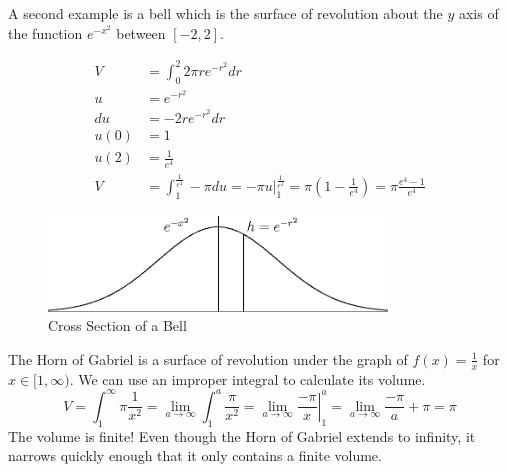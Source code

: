 \documentclass[fleqn]{report}
\begin{document}
\begin{example}
A second example is a bell which is the surface of revolution
about the $y$ axis of the function $e^{-x^2}$ between $[-2,2]$. 

\begin{align*}
V & = \int_0^2 2\pi re^{-r^2} dr \\
u & = e^{-r^2}\\
du & = -2r e^{-r^2} dr \\
u(0) & = 1 \\
u(2) & = \frac{1}{e^4} \\
V &= \int_1^{\frac{1}{e^4}} -\pi du = \left. -\pi u
\right|_1^{\frac{1}{e^4}} = \pi \left( 1 - \frac{1}{e^4}
\right) = \pi \frac{e^4-1}{e^4} 
\end{align*}
\end{example}

\begin{figure}[h]
\centering
\includegraphics[width=9cm]{figure22.eps}
\caption{Cross Section of a Bell}
\label{figure-cross-section-bell}
\end{figure}

\begin{example}
The Horn of Gabriel is a surface of revolution under the graph
of $f(x) = \frac{1}{x}$ for $x \in [1,\infty)$. We can use an
improper integral to calculate its volume.
\begin{equation*}
V = \int_1^\infty \pi \frac{1}{x^2} = \lim_{a \rightarrow
\infty} \int_1^a \frac{\pi}{x^2} = \lim_{a \rightarrow \infty}
\left. \frac{-\pi}{x} \right|_1^a = \lim_{a \rightarrow
\infty} \frac{-\pi}{a} + \pi = \pi
\end{equation*}
The volume is finite! Even though the Horn of Gabriel extends
to infinity, it narrows quickly enough that it only contains a
finite volume.
\end{example}
\end{document}
